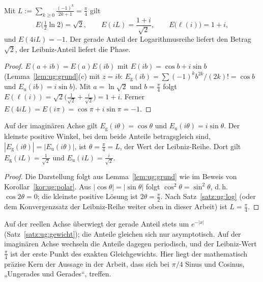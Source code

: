 \begin{korollar}\label{kor:ug:polar}
Mit $L:=\sum_{k\ge0}\frac{(-1)^k}{2k+1}=\frac\pi4$ gilt
\[
E\!\Big(\tfrac12\ln2\Big)=\sqrt2,\qquad E(iL)=\frac{1+i}{\sqrt2},\qquad E\big(\ell(i)\big)=1+i,
\]
und $E(4iL)=-1$. Der gerade Anteil der Logarithmusreihe liefert den Betrag $\sqrt2$, der Leibniz-Anteil liefert die Phase.
\end{korollar}

\begin{proof}
$E(a+ib)=E(a)E(ib)$ mit $E(ib)=\cos b+i\sin b$ (Lemma~\ref{lem:ug:grund}(c) mit $z=ib$: $E_{\mathrm g}(ib)=\sum(-1)^kb^{2k}/(2k)!=\cos b$ und $E_{\mathrm u}(ib)=i\sin b$). Mit $a=\ln\sqrt2$ und $b=\frac\pi4$ folgt $E(\ell(i))=\sqrt2\big(\tfrac1{\sqrt2}+\tfrac i{\sqrt2}\big)=1+i$. Ferner $E(4iL)=E(i\pi)=\cos\pi+i\sin\pi=-1$.
\end{proof}

\begin{satz}\label{satz:ug:gleichg}
Auf der imaginären Achse gilt $E_{\mathrm g}(i\theta)=\cos\theta$ und $E_{\mathrm u}(i\theta)=i\sin\theta$. Der kleinste positive Winkel, bei dem beide Anteile betragsgleich sind, $|E_{\mathrm g}(i\theta)|=|E_{\mathrm u}(i\theta)|$, ist $\theta=\frac\pi4=L$, der Wert der Leibniz-Reihe. Dort gilt $E_{\mathrm g}(iL)=\frac1{\sqrt2}$ und $E_{\mathrm u}(iL)=\frac{i}{\sqrt2}$.
\end{satz}

\begin{proof}
Die Darstellung folgt aus Lemma~\ref{lem:ug:grund} wie im Beweis von Korollar~\ref{kor:ug:polar}. Aus $|\cos\theta|=|\sin\theta|$ folgt $\cos^2\theta=\sin^2\theta$, d.\,h.\ $\cos2\theta=0$; die kleinste positive Lösung ist $2\theta=\frac\pi2$. Nach Satz~\ref{satz:ug:log} (oder dem Konvergenzsatz der Leibniz-Reihe weiter oben in dieser Arbeit) ist $L=\frac\pi4$.
\end{proof}

\begin{bemerkung}
Auf der reellen Achse überwiegt der gerade Anteil stets um $e^{-|x|}$ (Satz~\ref{satz:ug:gewicht}); die Anteile gleichen sich nur asymptotisch. Auf der imaginären Achse wechseln die Anteile dagegen periodisch, und der Leibniz-Wert $\frac\pi4$ ist der erste Punkt des exakten Gleichgewichts. Hier liegt der mathematisch präzise Kern der Aussage in der Arbeit, dass sich bei $\pi/4$ Sinus und Cosinus, „Ungerades und Gerades“, treffen.
\end{bemerkung}

